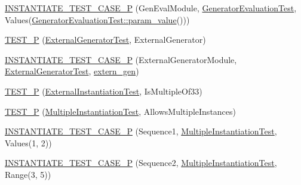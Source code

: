 \begin{DoxyCompactItemize}
\item 
\mbox{\hyperlink{_obj__test_2lib_2googletest-release-1_88_81_2googletest_2test_2googletest-param-test-test_8cc_a7bdfa4daa3eebd2b504e5028bef9e307}{I\+N\+S\+T\+A\+N\+T\+I\+A\+T\+E\+\_\+\+T\+E\+S\+T\+\_\+\+C\+A\+S\+E\+\_\+P}} (Gen\+Eval\+Module, \mbox{\hyperlink{class_generator_evaluation_test}{Generator\+Evaluation\+Test}}, Values(\mbox{\hyperlink{class_generator_evaluation_test_ac819769e32b738677401424deb3c8cbe}{Generator\+Evaluation\+Test\+::param\+\_\+value}}()))
\item 
\mbox{\hyperlink{_obj__test_2lib_2googletest-release-1_88_81_2googletest_2test_2googletest-param-test-test_8cc_a83249caca89bdaafc2b8b167ffe9e684}{T\+E\+S\+T\+\_\+P}} (\mbox{\hyperlink{class_external_generator_test}{External\+Generator\+Test}}, External\+Generator)
\item 
\mbox{\hyperlink{_obj__test_2lib_2googletest-release-1_88_81_2googletest_2test_2googletest-param-test-test_8cc_ae25f264afdef06f540bc6444ef1cd9c9}{I\+N\+S\+T\+A\+N\+T\+I\+A\+T\+E\+\_\+\+T\+E\+S\+T\+\_\+\+C\+A\+S\+E\+\_\+P}} (External\+Generator\+Module, \mbox{\hyperlink{class_external_generator_test}{External\+Generator\+Test}}, \mbox{\hyperlink{_obj__test_2lib_2googletest-release-1_88_81_2googletest_2test_2googletest-param-test2-test_8cc_a0f691f1461778d71f30b1fb1dea1cb50}{extern\+\_\+gen}})
\item 
\mbox{\hyperlink{_obj__test_2lib_2googletest-release-1_88_81_2googletest_2test_2googletest-param-test-test_8cc_aaa93e4bed0890e2fdf1d7ae232315753}{T\+E\+S\+T\+\_\+P}} (\mbox{\hyperlink{class_external_instantiation_test}{External\+Instantiation\+Test}}, Is\+Multiple\+Of33)
\item 
\mbox{\hyperlink{_obj__test_2lib_2googletest-release-1_88_81_2googletest_2test_2googletest-param-test-test_8cc_ad1bbb42b9a1b3bf455ee0dcb4f8c4fb2}{T\+E\+S\+T\+\_\+P}} (\mbox{\hyperlink{class_multiple_instantiation_test}{Multiple\+Instantiation\+Test}}, Allows\+Multiple\+Instances)
\item 
\mbox{\hyperlink{_obj__test_2lib_2googletest-release-1_88_81_2googletest_2test_2googletest-param-test-test_8cc_a8eaead32d82b7e4961a8dbbdc188cf98}{I\+N\+S\+T\+A\+N\+T\+I\+A\+T\+E\+\_\+\+T\+E\+S\+T\+\_\+\+C\+A\+S\+E\+\_\+P}} (Sequence1, \mbox{\hyperlink{class_multiple_instantiation_test}{Multiple\+Instantiation\+Test}}, Values(1, 2))
\item 
\mbox{\hyperlink{_obj__test_2lib_2googletest-release-1_88_81_2googletest_2test_2googletest-param-test-test_8cc_a736a895e9af032653ea5deeac7379795}{I\+N\+S\+T\+A\+N\+T\+I\+A\+T\+E\+\_\+\+T\+E\+S\+T\+\_\+\+C\+A\+S\+E\+\_\+P}} (Sequence2, \mbox{\hyperlink{class_multiple_instantiation_test}{Multiple\+Instantiation\+Test}}, Range(3, 5))

\end{DoxyCompactItemize}
